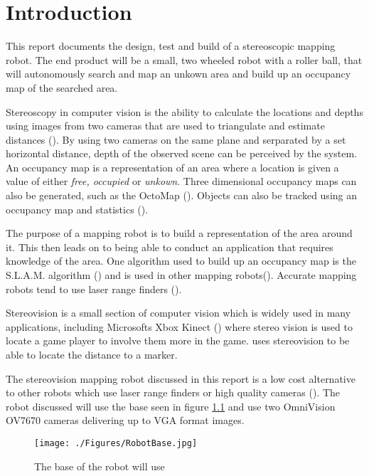 \chapter{Introduction} \label{Chapter:Introduction}

%
%
%
%


This report documents the design, test and build of a stereoscopic mapping robot. The end product will be a small, two wheeled robot with a roller ball, that will autonomously search and map an unkown area and build up an occupancy map of the searched area. 

Stereoscopy in computer vision is the ability to calculate the locations and depths using images from two cameras that are used to triangulate and estimate distances (\cite{Saxena:DepthEstimation}). By using two cameras on the same plane and serparated by a set horizontal distance, depth of the observed scene can be perceived by the system.
An occupancy map is a representation of an area where a location is given a value of either \textit{free, occupied} or \textit{unkown}.  Three dimensional occupancy maps can also be generated, such as the OctoMap (\cite{octomap}). Objects can also be tracked using an occupancy map and statistics (\cite{Fleuret:OccupancyMap}). 

The purpose of a mapping robot is to build a representation of the area around it. This then leads on to being able to conduct an application that requires knowledge of the area. One algorithm used to build up an occupancy map is the S.L.A.M. algorithm (\cite{Thrun:SLAM}) and is used in other mapping robots(\cite{Se:MappingRobot}). Accurate mapping robots tend to use laser range finders (\cite{Ruhnke:LaserMapping}).

Stereovision is a small section of computer vision which is widely used in many applications, including Microsofts Xbox Kinect (\cite{Microsoft:Kinect}) where stereo vision is used to locate a game player to involve them more in the game. \cite{Mrovlje:Distance_Stereoscopic} uses stereovision to be able to locate the distance to a marker.

The stereovision mapping robot discussed in this report is a low cost alternative to other robots which use laser range finders or high quality cameras (\cite{Se:MappingRobot}). The robot discussed will use the base seen in figure \ref{fig:RobotBase} and use two OmniVision OV7670 cameras delivering up to VGA format images.

\begin{figure}
\texttt{[image: ./Figures/RobotBase.jpg]}
\caption{The base of the robot will use}
\label{fig:RobotBase}
\end{figure}